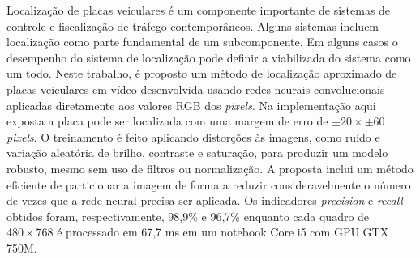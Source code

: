 
Localização de placas veiculares é um componente importante de sistemas de
controle e fiscalização de tráfego contemporâneos. Alguns sistemas incluem
localização como parte fundamental de um subcomponente. Em alguns casos
o desempenho do sistema de localização pode definir a viabilizada do sistema
como um todo. Neste trabalho, é proposto um método de localização aproximado
de placas veiculares em vídeo desenvolvida usando redes neurais convolucionais
aplicadas diretamente aos valores RGB dos \emph{pixels}. Na implementação aqui
exposta a placa pode ser localizada com uma margem de erro de
$ \pm 20 \times \pm 60$ \emph{pixels}.
O treinamento é feito aplicando distorções às imagens, como
ruído e variação aleatória de brilho, contraste e saturação, para produzir um
modelo robusto, mesmo sem uso de filtros ou normalização. A proposta inclui um
método eficiente de particionar a imagem de forma a reduzir consideravelmente o
número de vezes que a rede neural precisa ser aplicada. Os indicadores
\emph{precision} e \emph{recall} obtidos foram, respectivamente, 98,9\% e
96,7\% enquanto cada quadro de $480 \times 768$ é processado em 67,7 ms em
um notebook Core i5 com GPU GTX 750M.
